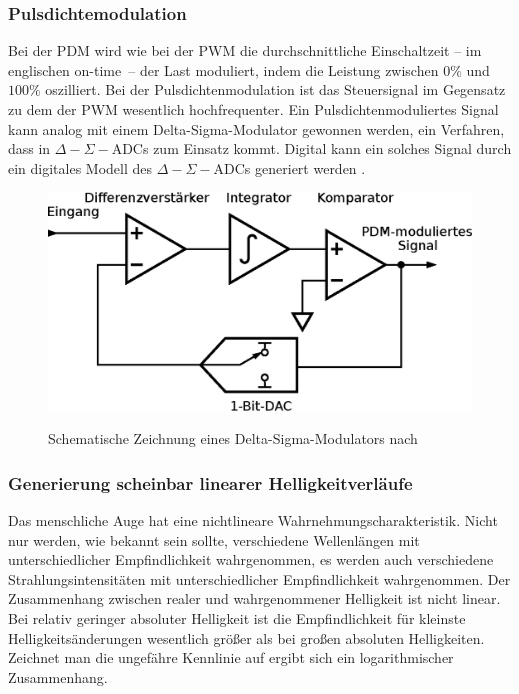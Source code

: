 \documentclass[12pt,a4paper,notitlepage]{article}
\begin{document}
\subsubsection{Pulsdichtemodulation}
Bei der \gls{PDM} wird wie bei der \gls{PWM} die durchschnittliche Einschaltzeit -- im englischen \glqq on-time\grqq\ -- der Last moduliert, indem die Leistung zwischen $0\%$ und $100\%$ oszilliert. Bei der Pulsdichtenmodulation ist das Steuersignal im Gegensatz zu dem der PWM wesentlich hochfrequenter. Ein Pulsdichtenmoduliertes Signal kann analog mit einem Delta-Sigma-Modulator gewonnen werden, ein Verfahren, dass in $\Delta-\Sigma-$ADCs zum Einsatz kommt. \cite{MAXIM21, MAXIM10} Digital kann ein solches Signal durch ein digitales Modell des $\Delta-\Sigma-$ADCs generiert werden \cite{WP1, WP3}.
\begin{figure}
\begin{center}
\includegraphics{images/delta-sigma-adc.eps}
\label{delta-sigma-modulator}
\caption{Schematische Zeichnung eines Delta-Sigma-Modulators nach \cite{MAXIM21}}
\end{center}
\end{figure}

\subsubsection{Generierung scheinbar linearer Helligkeitverläufe}
Das menschliche Auge hat eine nichtlineare Wahrnehmungscharakteristik. Nicht nur werden, wie bekannt sein sollte, verschiedene Wellenlängen mit unterschiedlicher Empfindlichkeit wahrgenommen, es werden auch verschiedene Strahlungsintensitäten mit unterschiedlicher Empfindlichkeit wahrgenommen. Der Zusammenhang zwischen realer und wahrgenommener Helligkeit ist nicht linear. Bei relativ geringer absoluter Helligkeit ist die Empfindlichkeit für kleinste Helligkeitsänderungen wesentlich größer als bei großen absoluten Helligkeiten. Zeichnet man die ungefähre Kennlinie auf ergibt sich ein logarithmischer Zusammenhang.
\end{document}
